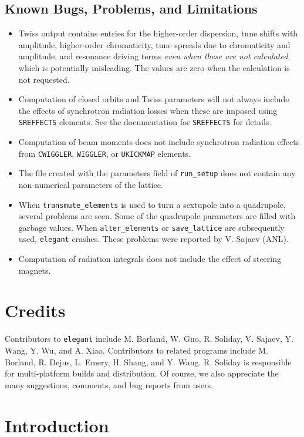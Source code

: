 \documentclass[11pt]{article}
\begin{document}
\subsection{Known Bugs, Problems, and Limitations}
\begin{itemize}
\item Twiss output contains entries for the higher-order dispersion, tune shifts with amplitude, higher-order chromaticity, tune spreads
  due to chromaticity and amplitude, and resonance driving terms {\em even when these are not calculated}, which is potentially
  misleading.   The values are zero when the calculation is not requested.
\item Computation of closed orbits and Twiss parameters will not always include the effects of synchrotron
  radiation losses when these are imposed using {\tt SREFFECTS} elements.  See
  the documentation for {\tt SREFFECTS} for details.
\item Computation of beam moments does not include synchrotron radiation effects from \verb|CWIGGLER|,
  \verb|WIGGLER|, or \verb|UKICKMAP| elements.
\item The file created with the parameters field of \verb|run_setup| does not contain
  any non-numerical parameters of the lattice.
\item When \verb|transmute_elements| is used to turn a sextupole into a quadrupole, several problems are seen.
 Some of the quadrupole parameters are filled with garbage values.  When \verb|alter_elements| or
 \verb|save_lattice| are subsequently used, \verb|elegant| crashes.   These problems were reported by 
 V. Sajaev (ANL).
\item Computation of radiation integrals does not include the effect of steering magnets.
\end{itemize}

\section{Credits}

Contributors to {\tt elegant} include M. Borland, W. Guo, R. Soliday, V. Sajaev, Y. Wang, Y. Wu, and A. Xiao.
Contributors to related programs include M. Borland, R. Dejus, L. Emery, H. Shang, and Y. Wang.
R. Soliday is responsible for multi-platform builds and distribution.
Of course, we also appreciate the many suggestions, comments, and bug reports from users.

\section{Introduction}
\end{document}
